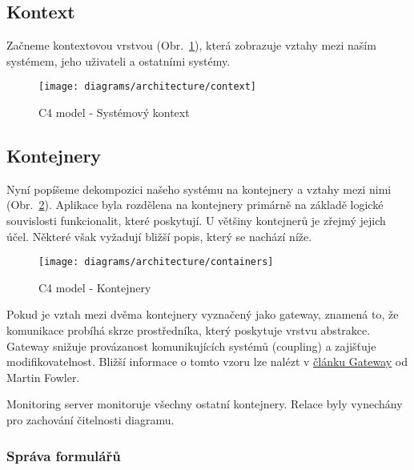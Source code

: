 \subsection{Kontext}\label{subsec:kontext}

Začneme kontextovou vrstvou (Obr.~\ref{fig:architecture-context}), která zobrazuje vztahy mezi naším systémem, jeho uživateli a ostatními systémy.

\begin{figure}[H]
    \centering
    \texttt{[image: diagrams/architecture/context]}
    \caption{C4 model - Systémový kontext}\label{fig:architecture-context}
\end{figure}

\subsection{Kontejnery}\label{subsec:kontejnery}

Nyní popíšeme dekompozici našeho systému na kontejnery a vztahy mezi nimi (Obr.~\ref{fig:architecture-containers}).
Aplikace byla rozdělena na kontejnery primárně na základě logické souvislosti funkcionalit, které poskytují.
U většiny kontejnerů je zřejmý jejich účel.
Některé však vyžadují bližší popis, který se nachází níže.

\begin{figure}[H]
    \centering
    \texttt{[image: diagrams/architecture/containers]}
    \caption{C4 model - Kontejnery}\label{fig:architecture-containers}
\end{figure}

\begin{tcolorbox}
    Pokud je vztah mezi dvěma kontejnery vyznačený jako gateway, znamená to, že komunikace probíhá skrze prostředníka, který poskytuje vrstvu abstrakce.
    Gateway snižuje provázanost komunikujících systémů (coupling) a zajišťuje modifikovatelnost.
    Bližší informace o tomto vzoru lze nalézt v \href{https://martinfowler.com/articles/gateway-pattern.html}{článku Gateway} od Martin Fowler.
\end{tcolorbox}

\begin{tcolorbox}
    Monitoring server monitoruje všechny ostatní kontejnery.
    Relace byly vynechány pro zachování čitelnosti diagramu.
\end{tcolorbox}

\subsubsection{Správa formulářů}\label{subsubsec:sprava-formularu}

